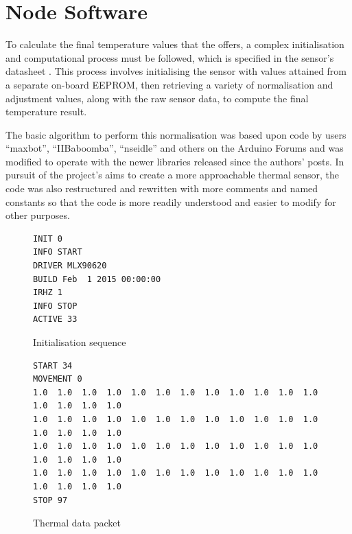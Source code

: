 \documentclass[../thesis/thesis.tex]{subfiles}
\begin{document}
\section{Node Software}

To calculate the final temperature values that the \mlx offers, a complex initialisation and computational process must be followed, which is specified in the sensor's datasheet \cite{MLXDatasheet}. This process involves initialising the sensor with values attained from a separate on-board \iic EEPROM, then retrieving a variety of normalisation and adjustment values, along with the raw sensor data, to compute the final temperature result.

The basic algorithm to perform this normalisation was based upon code by users ``maxbot'', ``IIBaboomba'', ``nseidle'' and others on the Arduino Forums \cite{ArduinoForum} and was modified to operate with the newer \ard \iic libraries released since the authors' posts. In pursuit of the project's aims to create a more approachable thermal sensor, the code was also restructured and rewritten with more comments and named constants so that the code is more readily understood and easier to modify for other purposes.



\begin{figure}
 \centering
\begin{lstlisting}[style=arduino]
INIT 0
INFO START
DRIVER MLX90620
BUILD Feb  1 2015 00:00:00
IRHZ 1
INFO STOP
ACTIVE 33
\end{lstlisting}
\caption{Initialisation sequence}
\label{fig:code:initseq}
\end{figure}

\begin{figure}
 \centering
\begin{lstlisting}[style=arduino]
START 34
MOVEMENT 0
1.0  1.0  1.0  1.0  1.0  1.0  1.0  1.0  1.0  1.0  1.0  1.0  1.0  1.0  1.0  1.0
1.0  1.0  1.0  1.0  1.0  1.0  1.0  1.0  1.0  1.0  1.0  1.0  1.0  1.0  1.0  1.0
1.0  1.0  1.0  1.0  1.0  1.0  1.0  1.0  1.0  1.0  1.0  1.0  1.0  1.0  1.0  1.0
1.0  1.0  1.0  1.0  1.0  1.0  1.0  1.0  1.0  1.0  1.0  1.0  1.0  1.0  1.0  1.0
STOP 97
\end{lstlisting}
\caption{Thermal data packet}
\label{fig:code:packet}
\end{figure}
\end{document}
